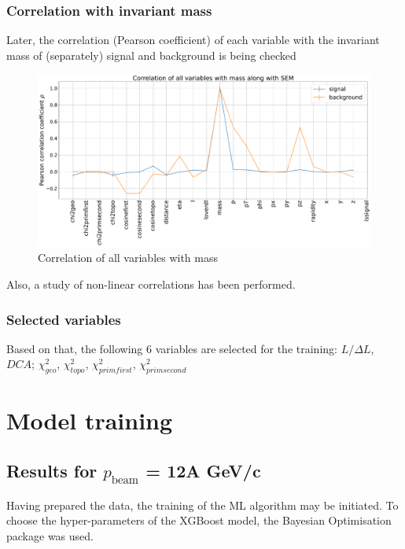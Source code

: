 \documentclass[12pt,a4paper]{report}
\begin{document}
\subsection{Correlation with invariant mass}
Later, the correlation (Pearson coefficient) of each variable with the invariant mass of (separately) signal and background is being checked 
\begin{figure}[H]
    \centering
    \includegraphics[width=1\textwidth]{images/Correlation_of_all_variables_with_mass_along_with_SEM.pdf}
    \caption{Correlation of all variables with mass}
\end{figure}
Also, a study of non-linear correlations has been performed. \cite{non-linear}

\subsection{Selected variables}
Based on that, the following 6 variables are selected for the training: $L/\Delta L$, $DCA$;  $\chi^2_{geo}$, $\chi^2_{topo}$, $\chi^2_{prim first}$, $\chi^2_{prim second}$

\chapter{Model training}
\section{Results for $p_{\text{beam}}$ = 12A GeV/c}
Having prepared the data, the training of the ML algorithm may be initiated. To choose the hyper-parameters of the XGBoost model, the Bayesian Optimisation package was used.\cite{bayesian}\\
\end{document}
